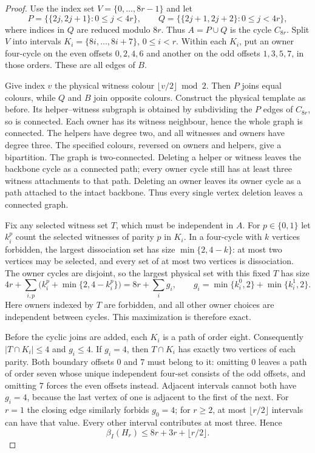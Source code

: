 \begin{proof}
Use the index set $V=\{0,\ldots,8r-1\}$ and let
\[
 P=\{\{2j,2j+1\}:0\le j<4r\},\qquad
 Q=\{\{2j+1,2j+2\}:0\le j<4r\},
\]
where indices in $Q$ are reduced modulo $8r$. Thus $A=P\cup Q$ is the
cycle $C_{8r}$. Split $V$ into intervals $K_i=\{8i,\ldots,8i+7\}$,
$0\le i<r$. Within each $K_i$, put an owner four-cycle on the even offsets
$0,2,4,6$ and another on the odd offsets $1,3,5,7$, in those orders.
These are all edges of $B$.

Give index $v$ the physical witness colour $\lfloor v/2\rfloor\bmod2$.
Then $P$ joins equal colours, while $Q$ and $B$ join opposite colours.
Construct the physical template as before. Its helper--witness subgraph is
obtained by subdividing the $P$ edges of $C_{8r}$, so is connected. Each
owner has its witness neighbour, hence the whole graph is connected. The
helpers have degree two, and all witnesses and owners have degree three.
The specified colours, reversed on owners and helpers, give a bipartition.
The graph is two-connected. Deleting a helper or witness leaves the backbone
cycle as a connected path; every owner cycle still has at least three
witness attachments to that path. Deleting an owner leaves its owner cycle
as a path attached to the intact backbone. Thus every single vertex deletion
leaves a connected graph.

Fix any selected witness set $T$, which must be independent in $A$.
For $p\in\{0,1\}$ let $k_i^p$ count the selected witnesses of parity $p$
in $K_i$. In a four-cycle with $k$ vertices forbidden, the largest
dissociation set has size $\min\{2,4-k\}$: at most two vertices may be
selected, and every set of at most two vertices is dissociation. The owner
cycles are disjoint, so the largest physical set with this fixed $T$ has size
\[
 4r+\sum_{i,p}\bigl(k_i^p+\min\{2,4-k_i^p\}\bigr)
 =8r+\sum_i g_i,\qquad
 g_i=\min\{k_i^0,2\}+\min\{k_i^1,2\}.
\]
Here owners indexed by $T$ are forbidden, and all other owner choices are
independent between cycles. This maximization is therefore exact.

Before the cyclic joins are added, each $K_i$ is a path of order eight.
Consequently
$|T\cap K_i|\le4$ and $g_i\le4$. If $g_i=4$, then $T\cap K_i$ has exactly
two vertices of each parity. Both boundary offsets $0$ and $7$ must belong
to it: omitting $0$ leaves a path of order seven whose unique independent
four-set consists of the odd offsets, and omitting $7$ forces the even
offsets instead. Adjacent intervals cannot both have $g_i=4$, because the
last vertex of one is adjacent to the first of the next. For $r=1$ the
closing edge similarly forbids $g_0=4$; for $r\ge2$, at most
$\lfloor r/2\rfloor$ intervals can have that value. Every other interval
contributes at most three. Hence
\[
 \beta_I(H_r)\le8r+3r+\lfloor r/2\rfloor.
\]


\end{proof}
